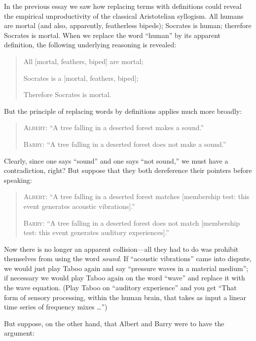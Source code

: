 {
 In the previous essay we saw how replacing terms with definitions
could reveal the empirical unproductivity of the classical Aristotelian
syllogism. All humans are mortal (and also, apparently, featherless
bipeds); Socrates is human; therefore Socrates is mortal. When we
replace the word ``human'' by its
apparent definition, the following underlying reasoning is revealed:}

\begin{quotation}
{
 All [mortal, {\textlnot}feathers, biped] are mortal;}

{
 Socrates is a [mortal, {\textlnot}feathers, biped];}

{
  Therefore Socrates is mortal.}
\end{quotation}

{
 But the principle of replacing words by definitions applies much
more broadly:}

\begin{quotation}
{
 \textsc{Albert}: ``A tree falling in a deserted forest
makes a sound.''}

{
 \textsc{Barry}: ``A tree falling in a deserted forest does
 not make a sound.''}
\end{quotation}

{
 Clearly, since one says
``sound'' and one says
``not sound,'' we must have a
contradiction, right? But suppose that they both dereference their
pointers before speaking:}

\begin{quotation}
{
 \textsc{Albert}: ``A tree falling in a deserted forest
matches [membership test: this event generates acoustic
vibrations].''}

{
 \textsc{Barry}: ``A tree falling in a deserted forest does
not match [membership test: this event generates auditory
  experiences].''}
\end{quotation}

{
 Now there is no longer an apparent collision---all they had to do
was prohibit themselves from using the word \textit{sound}. If
``acoustic vibrations'' came into
dispute, we would just play Taboo again and say
``pressure waves in a material
medium''; if necessary we would play Taboo again on
the word ``wave'' and replace it
with the wave equation. (Play Taboo on ``auditory
experience'' and you get ``That form
of sensory processing, within the human brain, that takes as input a
linear time series of frequency mixes \ldots'')}

{
 But suppose, on the other hand, that Albert and Barry were to have
the argument:}

